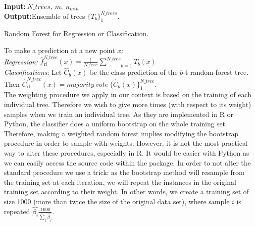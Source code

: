 \documentclass{article}
\newcommand{\algorithmicrequire}{\textbf{Input:}}
\newcommand{\algorithmicensure}{\textbf{Output:}}
\begin{document}
\begin{algorithm}[!ht]
 \algorithmicrequire $\ N\_trees, \ m , \ n_{min}$ \\
 \algorithmicensure  Ensemble of trees $\lbrace T_b \rbrace_1^{N\_trees}$.
 \caption{Random Forest for Regression or Classification.}
 \label{algo:1}
\end{algorithm}

To make a prediction at a new point $x$: \\
\textit{Regression:} $\hat{f}_{\text{rf}}^{N\_tree}(x)=\frac{1}{N\_tree}\underset{b=1}{\overset{N\_tree}{\sum}}T_b(x)$\\
\textit{Classifications:} Let $\hat{C}_b(x)$ be the class prediction of the $b$-t random-forest tree. Then $\hat{C}_{\text{rf}}^{N\_tree}(x) = majority \ vote \ \lbrace \hat{C}_b(x) \rbrace_1^{N\_tree} $. \\
The weighting procedure we apply in our context is based on the training of each individual tree. Therefore we wish to give more times (with respect to its weight) samples when we train an individual tree. As they are implemented in R or Python, the classifier does a uniform bootstrap on the whole training set. Therefore, making a weighted random forest implies modifying the bootstrap procedure in order to sample with weights. However, it is not the most practical way to alter these procedures, especially in R. It would be easier with Python as we can easily access the source code within the package. In order to not alter the standard procedure we use a trick: as the bootstrap method will resample from the training set at each iteration, we will repeat the instances in the original training set according to their weight. In other words, we create a training set of size 1000 (more than twice the size of the original data set), where sample $i$ is repeated $\hat{\beta_i}\frac{1000}{\sum_j \hat{\beta_j}}$.
\end{document}
